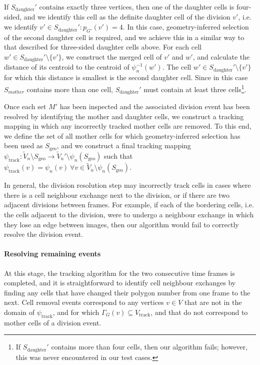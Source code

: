 \documentclass[a4paper,11pt]{article}
\begin{document}
\begin{enumerate}[noitemsep,label=(\roman*)]
If $S_{\mathrm{daughter}}'$ contains exactly three vertices, then one of the daughter cells is four-sided, and we identify this cell as the definite daughter cell of the division $v'$, i.e. we identify $v' \in S_{\mathrm{daughter}}' : p_{G'}(v') = 4$. 
In this case, geometry-inferred selection of the second daughter cell is required, and we achieve this in a similar way to that described for three-sided daughter cells above. 
For each cell $w' \in S_{\mathrm{daughter}}' \setminus \{ v' \}$, we construct the merged cell of $v'$ and $w'$, and calculate the distance of its centroid to the centroid of $\psi_{n}^{-1}(w')$. 
The cell $w' \in S_{\mathrm{daughter}}' \setminus \{ v' \}$ for which this distance is smallest is the second daughter cell.  
Since in this case $S_{mother}$ contains more than one cell, $S_{\mathrm{daughter}}'$ must contain at least three cells\footnote{If $S_{\mathrm{daughter}}'$ contains more than four cells, then our algorithm fails; however, this was never encountered in our test cases.}.
\end{enumerate}

Once each set $M'$ has been inspected and the associated division event has been resolved by identifying the mother and daughter cells, we construct a tracking mapping in which any incorrectly tracked mother cells are removed. 
To this end, we define the set of all mother cells for which geometry-inferred selection has been used as $S_\mathrm{geo}$, and we construct a final tracking mapping $\psi_\mathrm{track}: \tilde{V}_{n} \setminus S_\mathrm{geo} \rightarrow \tilde{V}_{n}' \setminus \psi_{n}(S_\mathrm{geo})$ such that $\psi_\mathrm{track}(v) = \psi_{n}(v)~\forall v \in \tilde{V}_{n}\setminus \psi_n(S_\mathrm{geo})$.

In general, the division resolution step may incorrectly track cells in cases where there is a cell neighbour exchange next to the division, or if there are two adjacent divisions between frames. 
For example, if each of the bordering cells, i.e. the cells adjacent to the division, were to undergo a neighbour exchange in which they lose an edge between images, then our algorithm would fail to correctly resolve the division event. 

\paragraph{Resolving remaining events} 

At this stage, the tracking algorithm for the two consecutive time frames is completed, and it is straightforward to identify cell neighbour exchanges by finding any cells that have changed their polygon number from one frame to the next. 
Cell removal events correspond to any vertices $v \in V$ that are not in the domain of $\psi_\mathrm{track}$, and for which $\Gamma_G(v) \subseteq V_\mathrm{track}$, and that do not correspond to mother cells of a division event.
\end{document}

